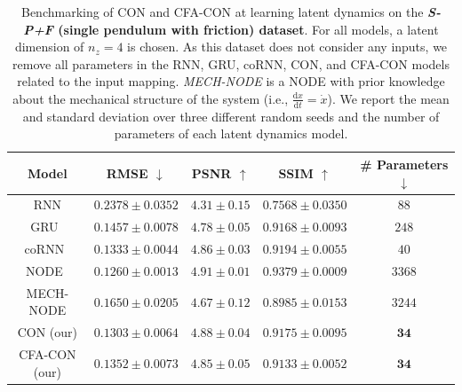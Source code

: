 \begin{table}[ht]
    \centering
    \begin{small}
    \begin{tabular}{c c c c c}
         \toprule
         \textbf{Model} & \textbf{RMSE} $\downarrow$ & \textbf{PSNR} $\uparrow$ & \textbf{SSIM} $\uparrow$ & \textbf{\# Parameters} $\downarrow$ \\
         \midrule
         RNN & $0.2378 \pm 0.0352$ & $4.31 \pm 0.15$ & $0.7568 \pm 0.0350$ & $88$\\
         GRU~\citep{cho2014learning} & $0.1457 \pm 0.0078$ & $4.78 \pm 0.05$ & $0.9168 \pm 0.0093$ & $248$\\
         coRNN~\citep{rusch2020coupled} & $0.1333 \pm 0.0044$ & $4.86 \pm 0.03$ & $0.9194 \pm 0.0055$ & $40$\\
         NODE~\citep{chen2018neural} & $\mathbf{0.1260 \pm 0.0013}$ & $\mathbf{4.91 \pm 0.01}$ & $\mathbf{0.9379 \pm 0.0009}$ & $3368$\\
         MECH-NODE & $0.1650 \pm 0.0205$ & $4.67 \pm 0.12$ & $0.8985 \pm 0.0153$ & $3244$\\
         CON (our) & $0.1303 \pm 0.0064$ & $4.88 \pm 0.04$ & $0.9175 \pm 0.0095$ & $\mathbf{34}$\\
         CFA-CON (our) & $0.1352 \pm 0.0073$ & $4.85 \pm 0.05$ & $0.9133 \pm 0.0052$ & $\mathbf{34}$\\
         \bottomrule
    \end{tabular}
    \end{small}
    \vspace{0.5cm}
    \caption{Benchmarking of \gls{CON} and \gls{CFA-CON} at learning latent dynamics on the \textbf{\emph{S-P+F} (single pendulum with friction) dataset}. For all models, a latent dimension of $n_z=4$ is chosen. 
    As this dataset does not consider any inputs, we remove all parameters in the RNN, GRU, coRNN, CON, and CFA-CON models related to the input mapping.
    \emph{MECH-NODE} is a \gls{NODE} with prior knowledge about the mechanical structure of the system (i.e., $\frac{\mathrm{d}x}{\mathrm{d}t} = \dot{x}$). We report the mean and standard deviation over three different random seeds and the number of parameters of each latent dynamics model.
    }
    \label{tab:apx-con:latent_dynamics_results:s_p_f}
\end{table}

